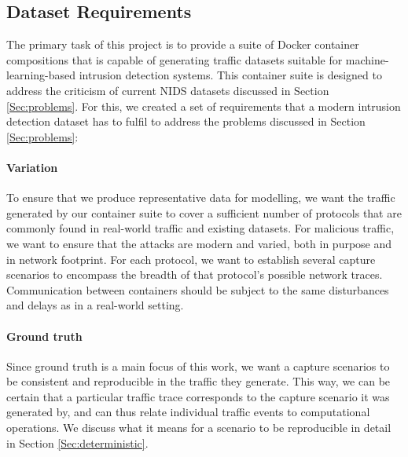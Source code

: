 \subsection{Dataset Requirements}\label{Sec:require}


The primary task of this project is to provide a suite of Docker container compositions that is capable of generating traffic datasets suitable for machine-learning-based intrusion detection systems. This container suite is designed to address the criticism of current NIDS datasets discussed in Section \ref{Sec:problems}. For this, we created a set of requirements that a modern intrusion detection dataset has to fulfil to address the problems discussed in Section \ref{Sec:problems}:





 \paragraph{Variation} To ensure that we produce representative data for modelling, we want the traffic generated by our container suite to cover a sufficient number of protocols that are commonly found in real-world traffic and existing datasets. For malicious traffic, we want to ensure that the attacks are modern and varied, both in purpose and in network footprint. For each protocol, we want to establish several capture scenarios to encompass the breadth of that protocol's possible network traces. Communication between containers should be subject to the same disturbances and delays as in a real-world setting.

 
 
\paragraph{Ground truth} Since ground truth is a main focus of this work, we want a capture scenarios to be consistent and reproducible in the traffic they generate. This way, we can be certain that a particular traffic trace corresponds to the capture scenario it was generated by, and can thus relate individual traffic events to computational operations. We discuss what it means for a scenario to be reproducible in detail in Section \ref{Sec:deterministic}. 

